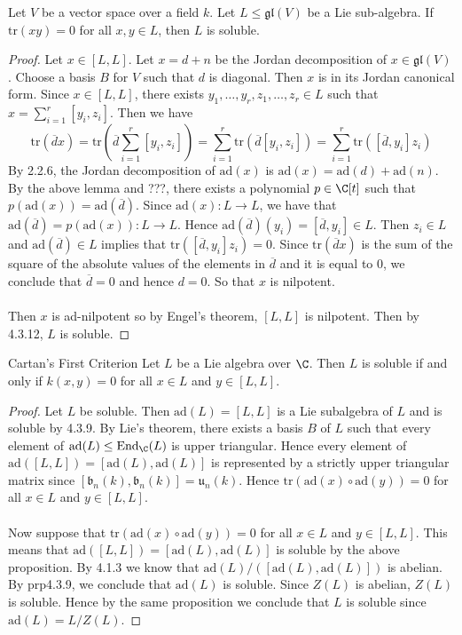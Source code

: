 \documentclass[a4paper]{article}
\begin{document}
\begin{prp}{}{} Let $V$ be a vector space over a field $k$. Let $L\leq\mathfrak{gl}(V)$ be a Lie sub-algebra. If $\text{tr}(xy)=0$ for all $x,y\in L$, then $L$ is soluble. \tcbline
\begin{proof}
Let $x\in [L,L]$. Let $x=d+n$ be the Jordan decomposition of $x\in\mathfrak{gl}(V)$. Choose a basis $B$ for $V$ such that $d$ is diagonal. Then $x$ is in its Jordan canonical form. Since $x\in[L,L]$, there exists $y_1,\dots,y_r,z_1,\dots,z_r\in L$ such that $x=\sum_{i=1}^r[y_i,z_i]$. Then we have $$\text{tr}(\overline{d}x)=\text{tr}\left(\overline{d}\sum_{i=1}^r[y_i,z_i]\right)=\sum_{i=1}^r\text{tr}(\overline{d}[y_i,z_i])=\sum_{i=1}^r\text{tr}([\overline{d},y_i]z_i)$$ By 2.2.6, the Jordan decomposition of $\text{ad}(x)$ is $\text{ad}(x)=\text{ad}(d)+\text{ad}(n)$. By the above lemma and ???, there exists a polynomial $p\in\C[t]$ such that $p(\text{ad}(x))=\text{ad}(\overline{d})$. Since $\text{ad}(x):L\to L$, we have that $\text{ad}(\overline{d})=p(\text{ad}(x)):L\to L$. Hence $\text{ad}(\overline{d})(y_i)=[\overline{d},y_i]\in L$. Then $z_i\in L$ and $\text{ad}(\overline{d})\in L$ implies that $\text{tr}([\overline{d},y_i]z_i)=0$. Since $\text{tr}(\overline{d}x)$ is the sum of the square of the absolute values of the elements in $\overline{d}$ and it is equal to $0$, we conclude that $\overline{d}=0$ and hence $d=0$. So that $x$ is nilpotent. \\~\\

Then $x$ is ad-nilpotent so by Engel's theorem, $[L,L]$ is nilpotent. Then by 4.3.12, $L$ is soluble. 
\end{proof}
\end{prp}

\begin{thm}{Cartan's First Criterion}{} Let $L$ be a Lie algebra over $\C$. Then $L$ is soluble if and only if $k(x,y)=0$ for all $x\in L$ and $y\in[L,L]$. \tcbline
\begin{proof}
Let $L$ be soluble. Then $\text{ad}(L)=[L,L]$ is a Lie subalgebra of $L$ and is soluble by 4.3.9. By Lie's theorem, there exists a basis $B$ of $L$ such that every element of $\text{ad}(L)\leq\text{End}_\C(L)$ is upper triangular. Hence every element of $\text{ad}([L,L])=[\text{ad}(L),\text{ad}(L)]$ is represented by a strictly upper triangular matrix since $[\mathfrak{b}_n(k),\mathfrak{b}_n(k)]=\mathfrak{u}_n(k)$. Hence $\text{tr}(\text{ad}(x)\circ\text{ad}(y))=0$ for all $x\in L$ and $y\in[L,L]$. \\~\\

Now suppose that $\text{tr}(\text{ad}(x)\circ\text{ad}(y))=0$ for all $x\in L$ and $y\in[L,L]$. This means that $\text{ad}([L,L])=[\text{ad}(L),\text{ad}(L)]$ is soluble by the above proposition. By 4.1.3 we know that $\text{ad}(L)/([\text{ad}(L),\text{ad}(L)])$ is abelian. By prp4.3.9, we conclude that $\text{ad}(L)$ is soluble. Since $Z(L)$ is abelian, $Z(L)$ is soluble. Hence by the same proposition we conclude that $L$ is soluble since $\text{ad}(L)=L/Z(L)$. 
\end{proof}
\end{thm}
\end{document}
